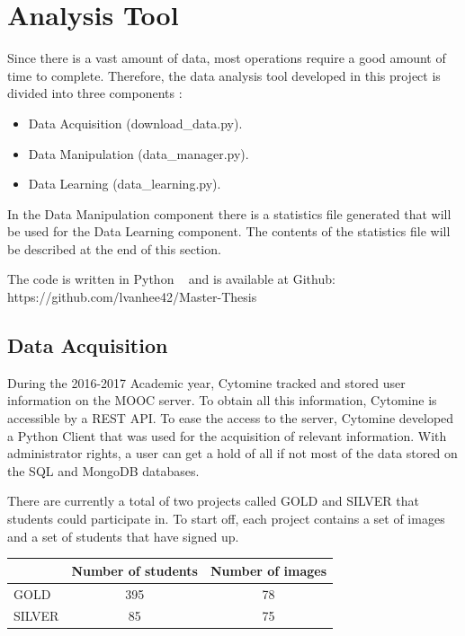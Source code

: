 \documentclass[a4paper,11pt]{report}
\numberwithin{figure}{chapter} %
\begin{document}
    \section{Analysis Tool}
    	Since there is a vast amount of data, most operations require a good amount of time to complete.
    	Therefore, the data analysis tool developed in this project is divided into three components :
        \begin{itemize}
        \item[\textbullet] Data Acquisition (download\_data.py).
        \item[\textbullet] Data Manipulation (data\_manager.py).
        \item[\textbullet] Data Learning (data\_learning.py).
        \end{itemize}

        In the Data Manipulation component there is a statistics file generated that will be used for the Data Learning component.
        The contents of the statistics file will be described at the end of this section.

        The code is written in Python ~\cite{pyth} and is available at Github: \\
        https://github.com/lvanhee42/Master-Thesis

		\subsection{Data Acquisition}

			During the 2016-2017 Academic year, Cytomine tracked and stored user information on the MOOC server.
			To obtain all this information, Cytomine is accessible by a REST API. To ease the access to the server, Cytomine developed a Python Client that was used for the acquisition of relevant information.
			With administrator rights, a user can get a hold of all if not most of the data stored on the SQL and MongoDB databases.

          There are currently a total of two projects called GOLD and SILVER that students could participate in.
          To start off, each project contains a set of images and a set of students that have signed up.

          \begin{center}
          \begin{tabular}{| l | c | c |}
          \hline
           & Number of students & Number of images \\ \hline
           GOLD & 395 & 78 \\ \hline
           SILVER & 85 & 75 \\
          \hline
          \end{tabular}
          \end{center}
\end{document}
